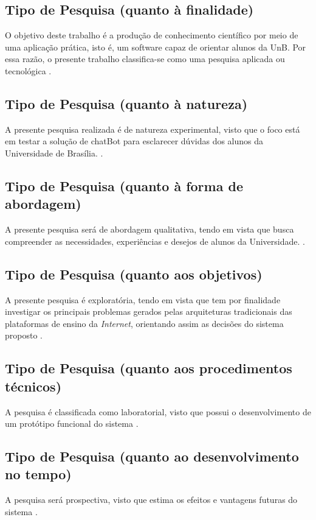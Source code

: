 \subsection{Tipo de Pesquisa (quanto à finalidade)}
O objetivo deste trabalho é a produção de conhecimento científico por meio de uma aplicação prática, isto é, um software capaz de orientar alunos da UnB. Por essa razão, o presente trabalho classifica-se como uma pesquisa aplicada ou tecnológica \cite{fontelles2009}.

\subsection{Tipo de Pesquisa (quanto à natureza)}
A presente pesquisa realizada é de natureza experimental, visto que o foco está em testar a solução de chatBot para esclarecer dúvidas dos alunos da Universidade de Brasília. \cite{fontelles2009}.

\subsection{Tipo de Pesquisa (quanto à forma de abordagem)}
A presente pesquisa será de abordagem qualitativa, tendo em vista que busca compreender as necessidades, experiências e desejos de alunos da Universidade. \cite{fontelles2009}.

\subsection{Tipo de Pesquisa (quanto aos objetivos)}
A presente pesquisa é exploratória, tendo em vista que tem por finalidade investigar os principais problemas gerados pelas arquiteturas tradicionais das plataformas de ensino da \textit{Internet}, orientando assim as decisões do sistema proposto \cite{fontelles2009}.

\subsection{Tipo de Pesquisa (quanto aos procedimentos técnicos)}
A pesquisa é classificada como laboratorial, visto que possui o desenvolvimento de um protótipo funcional do sistema \cite{fontelles2009}.

\subsection{Tipo de Pesquisa (quanto ao desenvolvimento no tempo)}
A pesquisa será prospectiva, visto que estima os efeitos e vantagens futuras do sistema \cite{fontelles2009}.

